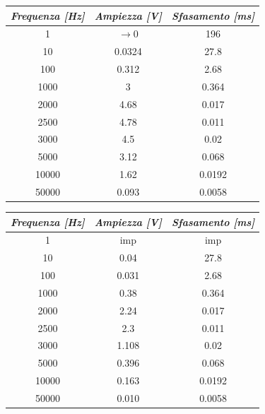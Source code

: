     \begin{table} [!ht]
        \begin{minipage}{.525\linewidth}
            \centering
            \begin{tabular}{|c|c|c|}
                \hline
                \textit{Frequenza [Hz]} & \textit{Ampiezza [V]} & \textit{Sfasamento [ms]} \\
                \hline
                1 & $\longrightarrow 0$ & 196 \\
                \hline
                10 & 0.0324 & 27.8 \\
                \hline
                100 & 0.312 & 2.68 \\
                \hline
                1000 & 3 & 0.364 \\
                \hline
                2000 & 4.68 & 0.017 \\
                \hline
                2500 & 4.78 & 0.011 \\
                \hline
                3000 & 4.5 & 0.02 \\
                \hline
                5000 & 3.12 & 0.068 \\
                \hline
                10000 & 1.62 & 0.0192 \\
                \hline
                50000 & 0.093 & 0.0058 \\
                \hline
            \end{tabular}
        \end{minipage}
        \begin{minipage}{.525\linewidth}
            \centering
            \begin{tabular}{|c|c|c|}
                \hline
                \textit{Frequenza [Hz]} & \textit{Ampiezza [V]} & \textit{Sfasamento [ms]} \\
                \hline
                1 & imp & imp \\
                \hline
                10 & 0.04 & 27.8 \\
                \hline
                100 & 0.031 & 2.68 \\
                \hline
                1000 & 0.38 & 0.364 \\
                \hline
                2000 & 2.24 & 0.017 \\
                \hline
                2500 & 2.3 & 0.011 \\
                \hline
                3000 & 1.108 & 0.02 \\
                \hline
                5000 & 0.396 & 0.068 \\
                \hline
                10000 & 0.163 & 0.0192 \\
                \hline
                50000 & 0.010 & 0.0058 \\
                \hline
            \end{tabular}
        \end{minipage}
    \end{table}

